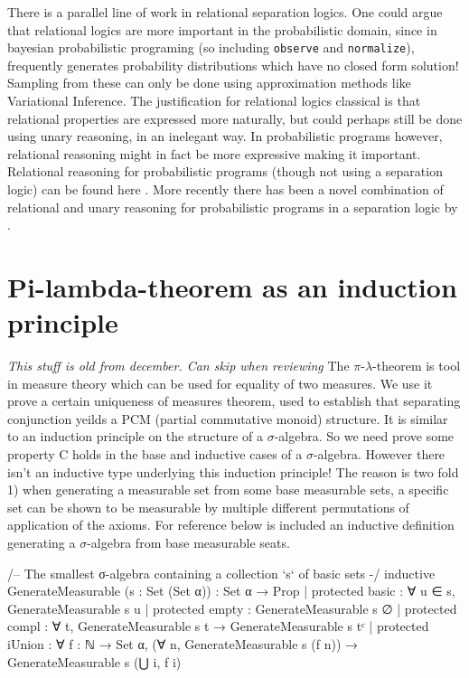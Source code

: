 There is a parallel line of work in relational separation logics. One could argue that relational logics are more important in the probabilistic domain, since in bayesian
probabilistic programing (so including \texttt{observe} and \texttt{normalize}), frequently generates probability distributions which have no closed form solution! Sampling
from these can only be done using approximation methods like Variational Inference. The justification for relational logics classical is that relational properties are
expressed more naturally, but could perhaps still be done using unary reasoning, in an inelegant way. In probabilistic programs however, relational reasoning might
in fact be more expressive making it important. Relational reasoning for probabilistic programs (though not using a separation logic) can be found here \cite{relational-logic}.
More recently there has been a novel combination of relational and unary reasoning for probabilistic programs in a separation logic by \citep{bluebell}.

\section{Pi-lambda-theorem as an induction principle}
\emph{This stuff is old from december. Can skip when reviewing}
\label{pi-lambda}
The $\pi$-$\lambda$-theorem is tool in measure theory which can be used for equality of two measures. We use it prove a certain uniqueness of measures theorem,
used to establish that separating conjunction yeilds a PCM (partial commutative monoid) structure.
It is similar to an induction principle on the structure of a $\sigma$-algebra. So we need prove some property C holds in the base and inductive cases
of a $\sigma$-algebra. However there isn't an inductive type underlying this
induction principle! The reason is two fold 1) when generating a measurable set from some base measurable sets, a specific
set can be shown to be measurable by multiple different permutations of application of the axioms. For reference below
is included an inductive definition generating a $\sigma$-algebra from base measurable seats.

\begin{leancode}
/-- The smallest σ-algebra containing a collection `s` of basic sets -/
inductive GenerateMeasurable (s : Set (Set α)) : Set α → Prop
  | protected basic : ∀ u ∈ s, GenerateMeasurable s u
  | protected empty : GenerateMeasurable s ∅
  | protected compl : ∀ t, GenerateMeasurable s t → GenerateMeasurable s tᶜ
  | protected iUnion : ∀ f : ℕ → Set α, (∀ n, GenerateMeasurable s (f n)) →
      GenerateMeasurable s (⋃ i, f i)
\end{leancode}

